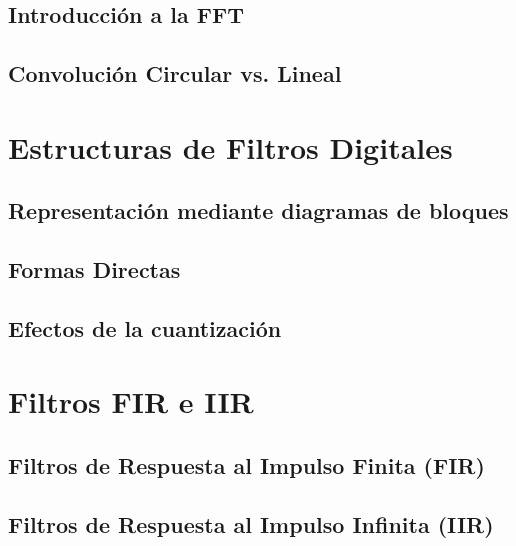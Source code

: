 \documentclass[11pt,a4paper,openany]{book}
\begin{document}
\section{Introducción a la FFT}

\section{Convolución Circular vs. Lineal}



\chapter{Estructuras de Filtros Digitales}

\section{Representación mediante diagramas de bloques}

\section{Formas Directas}

\section{Efectos de la cuantización}

\chapter{Filtros FIR e IIR}

\section{Filtros de Respuesta al Impulso Finita (FIR)}

\section{Filtros de Respuesta al Impulso Infinita (IIR)}
\end{document}

